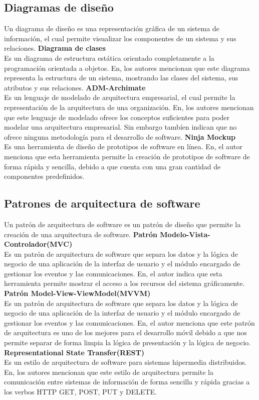 \subsection{Diagramas de diseño}
Un diagrama de diseño es una representación gráfica de un sistema de información, el cual permite visualizar los componentes de un sistema y sus relaciones.
\bigbreak
\textbf{Diagrama de clases} \\
Es un diagrama de estructura estática orientado completamente a la programación orientada a objetos.
En\cite{leonardoMejoraControlAsistencia2019}, los autores mencionan que este diagrama representa la estructura de un sistema, mostrando las clases del sistema, sus atributos y sus relaciones.
\bigbreak
\textbf{ADM-Archimate} \\
Es un lenguaje de modelado de arquitectura empresarial, el cual permite la representación de la arquitectura de una organización. En\cite{nietoPrototipoAplicacionWeb2018}, los autores mencionan que este lenguaje de modelado ofrece los conceptos suficientes para poder modelar una arquitectura empresarial. Sin embargo tambíen indican que no ofrece ninguna metodología para el desarrollo de software.
\bigbreak
\textbf{Ninja Mockup} \\
Es una herramienta de diseño de prototipos de software en línea. En\cite{ortegaPrototipoSistemaWeb2020}, el autor menciona que esta herramienta permite la creación de prototipos de software de forma rápida y sencilla, debido a que cuenta con una gran cantidad de componentes predefinidos.
\bigbreak

\subsection{Patrones de arquitectura de software}
Un patrón de arquitectura de software es un patrón de diseño que permite la creación de una arquitectura de software.
\bigbreak
\textbf{Patrón Modelo-Vista-Controlador(MVC)} \\
Es un patrón de arquitectura de software que separa los datos y la lógica de negocio de una aplicación de la interfaz de usuario y el módulo encargado de gestionar los eventos y las comunicaciones. En\cite{leonardoMejoraControlAsistencia2019}, el autor indica que esta herramienta permite mostrar el acceso a los recursos del sistema gráficamente.
\bigbreak
\textbf{Patrón Model-View-ViewModel(MVVM)} \\
Es un patrón de arquitectura de software que separa los datos y la lógica de negocio de una aplicación de la interfaz de usuario y el módulo encargado de gestionar los eventos y las comunicaciones.
En\cite{leonardoMejoraControlAsistencia2019}, el autor menciona que este patrón de arquitectura es uno de los mejores para el desarrollo móvil debido a que nos permite separar de forma limpia la lógica de presentación y la lógica de negocio.
\bigbreak
\textbf{Representational State Transfer(REST)} \\
Es un estilo de arquitectura de software para sistemas hipermedia distribuidos. En\cite{montalvoDesarrolloSistemaSoftware2023}, los autores mencionan que este estilo de arquitectura permite la comunicación entre sistemas de información de forma sencilla y rápida gracias a los verbos HTTP GET, POST, PUT y DELETE.

